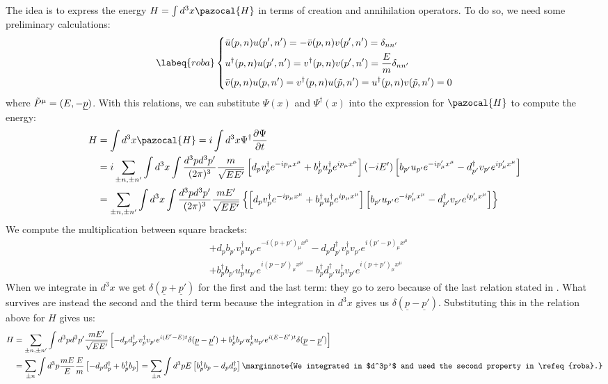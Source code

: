 \documentclass[../main.tex]{subfiles}
\begin{document}
The idea is to express the energy $H=\int d^3x\pazocal{H}$ in terms of creation and annihilation operators. To do so, we need some preliminary calculations:
\begin{equation}
\labeq{roba}
\left\{
\begin{aligned}
&\bar{u}(p,n)u(p',n')=-\bar{v}(p,n)v(p',n')=\delta_{nn'}\\
&u^\dagger(p,n)u(p',n')=v^\dagger(p,n)v(p',n')=\frac{E}{m}\delta_{nn'}\\
&\bar{v}(p,n)u(p,n')=v^\dagger(p,n)u(\Tilde{p},n')=u^\dagger(p,n)v(\Tilde{p},n')=0
\end{aligned}
\right.
\end{equation}
where $\Tilde{P}^\mu=(E,-\underline{p})$.
With this relations, we can substitute $\Psi(x)$ and $\Psi^\dagger(x)$ into the expression for $\pazocal{H}$ to compute the energy:
\begin{align*}
H&=\int d^3x\pazocal{H}=i\int d^3x\Psi^\dagger\frac{\partial\Psi}{\partial t}\\
&=i\sum_{\pm n,\pm n'}\int d^3x\int\frac{d^3pd^3p'}{(2\pi)^3}\frac{m}{\sqrt{EE'}}\left[d_pv^\dagger_pe^{-ip_\mu x^\mu}+b^\dagger_pu^\dagger_pe^{ip_\mu x^\mu}\right](-iE')\left[b_{p'}u_{p'}e^{-ip'_\mu x^\mu}-d^\dagger_{p'}v_{p'}e^{ip'_\mu x^\mu}\right]\\
&=\sum_{\pm n,\pm n'}\int d^3x\int\frac{d^3pd^3p'}{(2\pi)^3}\frac{mE'}{\sqrt{EE'}}\left\{\left[d_pv^\dagger_pe^{-ip_\mu x^\mu}+b^\dagger_pu^\dagger_pe^{ip_\mu x^\mu}\right]\left[b_{p'}u_{p'}e^{-ip'_\mu x^\mu}-d^\dagger_{p'}v_{p'}e^{ip'_\mu x^\mu}\right]\right\}
\end{align*}
We compute the multiplication between square brackets:
\begin{align*}
&+d_pb_{p'}v^\dagger_pu_{p'}e^{-i(p+p')_\mu x^\mu}-d_pd^\dagger_{p'}v^\dagger_pv_{p'}e^{i(p'-p)_\mu x^\mu}\\
&+b^\dagger_pb_{p'}u^\dagger_pu_{p'}e^{i(p-p')_\mu x^\mu}-b^\dagger_pd^\dagger_{p'}u^\dagger_pv_{p'}e^{i(p+p')_\mu x^\mu}
\end{align*}
When we integrate in $d^3x$ we get $\delta(\underline{p}+\underline{p}')$ for the first and the last term: they go to zero because of the last relation stated in . What survives are instead the second and the third term because the integration in $d^3x$ gives us $\delta(\underline{p}-\underline{p}')$. Substituting this in the relation above for $H$ gives us:
\begin{align*}
H&=\sum_{\pm n,\pm n'}\int d^3pd^3p'\frac{mE'}{\sqrt{EE'}}\left[-d_pd^\dagger_{p'}v^\dagger_pv_{p'}e^{i(E'-E)t}\delta(\underline{p}-\underline{p}')+b^\dagger_pb_{p'}u^\dagger_pu_{p'}e^{i(E-E')t}\delta(\underline{p}-\underline{p}')\right]\\
&=\sum_{\pm n}\int d^3p\frac{mE}{E}\frac{E}{m}\left[-d_pd^\dagger_p+b^\dagger_pb_p\right]=\sum_{\pm n}\int d^3pE\left[b^\dagger_pb_p-d_pd^\dagger_p\right]\marginnote{We integrated in $d^3p'$ and used the second property in \refeq{roba}.}
\end{align*}
\end{document}
